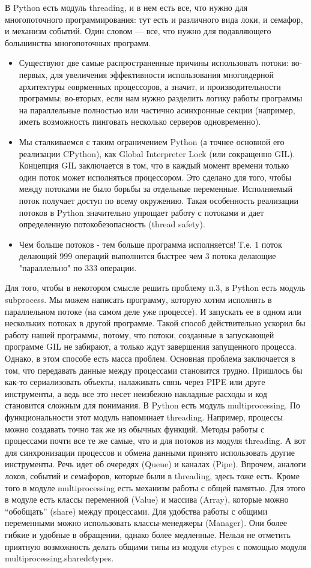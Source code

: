 В Python есть модуль threading, и в нем есть все, что нужно для многопоточного программирования: тут есть и различного вида локи, и семафор, и механизм событий. Один словом — все, что нужно для подавляющего большинства многопоточных программ.
\begin{itemize}
\item Существуют две самые распространенные причины использовать потоки: во-первых, для увеличения эффективности использования многоядерной архитектуры cоврменных процессоров, а значит, и производительности программы;
во-вторых, если нам нужно разделить логику работы программы на параллельные полностью или частично асинхронные секции (например, иметь возможность пинговать несколько серверов одновременно).
\item Мы сталкиваемся с таким ограничением Python (а точнее основной его реализации CPython), как Global Interpreter Lock (или сокращенно GIL). Концепция GIL заключается в том, что в каждый момент времени только один поток может исполняться процессором. Это сделано для того, чтобы между потоками не было борьбы за отдельные переменные. Исполняемый поток получает доступ по всему окружению. Такая особенность реализации потоков в Python значительно упрощает работу с потоками и дает определенную потокобезопасность (thread safety).
\item Чем больше потоков - тем больше программа исполняется! Т.е. 1 поток делающий 999 операций выполнится быстрее чем 3 потока делающие "параллельно" по 333 операции.
\end{itemize}

Для того, чтобы в некотором смысле решить проблему п.3, в Python есть модуль subprocess. Мы можем написать программу, которую хотим исполнять в параллельном потоке (на самом деле уже процессе). И запускать ее в одном или нескольких потоках в другой программе. Такой способ действительно ускорил бы работу нашей программы, потому, что потоки, созданные в запускающей программе GIL не забирают, а только ждут завершения запущенного процесса. Однако, в этом способе есть масса проблем. Основная проблема заключается в том, что передавать данные между процессами становится трудно. Пришлось бы как-то сериализовать объекты, налаживать связь через PIPE или друге инструменты, а ведь все это несет неизбежно накладные расходы и код становится сложным для понимания.
В Python есть модуль multiprocessing. По функциональности этот модуль напоминает threading. Например, процессы можно создавать точно так же из обычных функций. Методы работы с процессами почти все те же самые, что и для потоков из модуля threading. А вот для синхронизации процессов и обмена данными принято использовать другие инструменты. Речь идет об очередях (Queue) и каналах (Pipe). Впрочем, аналоги локов, событий и семафоров, которые были в threading, здесь тоже есть.
Кроме того в модуле multiprocessing есть механизм работы с общей памятью. Для этого в модуле есть классы переменной (Value) и массива (Array), которые можно “обобщать” (share) между процессами. Для удобства работы с общими переменными можно использовать классы-менеджеры (Manager). Они более гибкие и удобные в обращении, однако более медленные. Нельзя не отметить приятную возможность делать общими типы из модуля ctypes с помощью модуля multiprocessing.sharedctypes.

